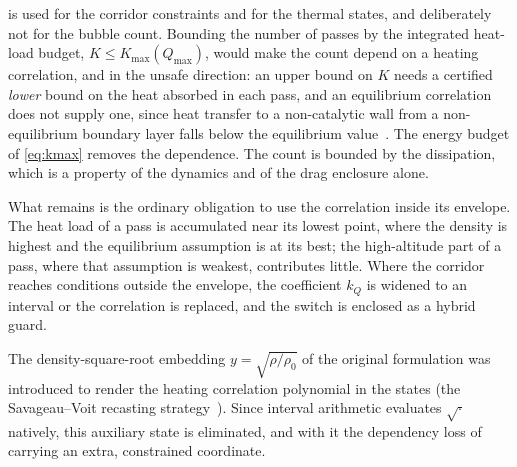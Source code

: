 \begin{remark}\label{rem:sutton-graves-circularity}
 is used for the corridor constraints and for the thermal
states, and deliberately not for the bubble count. Bounding the number of
passes by the integrated heat-load budget, $K \le K_{\max}(Q_{\max})$,
would make the count depend on a heating correlation, and in the unsafe
direction: an upper bound on $K$ needs a certified \emph{lower} bound on
the heat absorbed in each pass, and an equilibrium correlation does not
supply one, since heat transfer to a non-catalytic wall from a
non-equilibrium boundary layer falls below the equilibrium
value~\cite{fay1958theory}. The energy budget of \cref{eq:kmax} removes the
dependence. The count is bounded by the dissipation, which is a property
of the dynamics and of the drag enclosure alone.

What remains is the ordinary obligation to use the correlation inside its
envelope. The heat load of a pass is accumulated near its lowest point,
where the density is highest and the equilibrium assumption is at its
best; the high-altitude part of a pass, where that assumption is weakest,
contributes little. Where the corridor reaches conditions outside the
envelope, the coefficient $k_Q$ is widened to an interval or the
correlation is replaced, and the switch is enclosed as a hybrid guard.
\end{remark}

\begin{remark}\label{rem:thermal-embedding}
The density-square-root embedding
$y = \sqrt{\rho/\rho_0}$ of the original formulation was introduced to
render the heating correlation polynomial in the states (the
Savageau--Voit recasting strategy~\cite{savageau1987recasting}). Since interval
arithmetic evaluates $\sqrt{\cdot}$ natively, this auxiliary state is
eliminated, and with it the dependency loss of carrying an extra,
constrained coordinate.
\end{remark}


